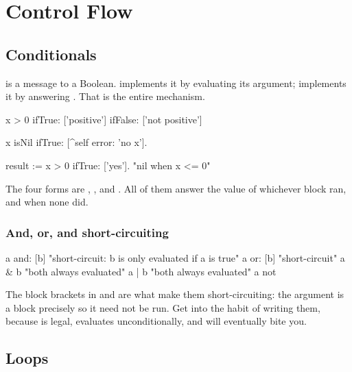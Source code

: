 \chapter{Control Flow}
\label{ch:control}


\section{Conditionals}

 is a message to a Boolean.  implements it by evaluating
its argument;  implements it by answering . That is the
entire mechanism.

\begin{st}
x > 0
    ifTrue: ['positive']
    ifFalse: ['not positive']

x isNil ifTrue: [^self error: 'no x'].

result := x > 0 ifTrue: ['yes'].     "nil when x <= 0"
\end{st}

The four forms are , ,  and
. All of them answer the value of whichever block ran, and
 when none did.

\subsection{And, or, and short-circuiting}

\begin{st}
a and: [b]           "short-circuit: b is only evaluated if a is true"
a or: [b]            "short-circuit"
a & b                "both always evaluated"
a | b                "both always evaluated"
a not
\end{st}

The block brackets in  and  are what make them
short-circuiting: the argument is a block precisely so it need not be run. Get
into the habit of writing them, because  is legal, evaluates
 unconditionally, and will eventually bite you.

\section{Loops}

